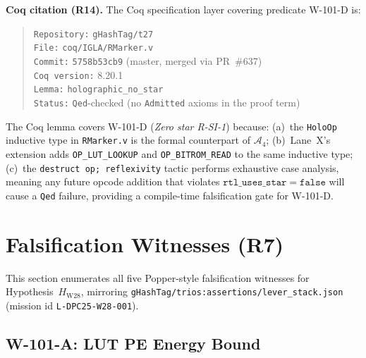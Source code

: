 \noindent
\textbf{Coq citation (R14).}
The Coq specification layer covering predicate W-101-D is:

\begin{quote}
\texttt{Repository:} \texttt{gHashTag/t27}\\
\texttt{File:} \texttt{coq/IGLA/RMarker.v}\\
\texttt{Commit:} \texttt{5758b53cb9} (master, merged via PR~\#637)\\
\texttt{Coq version:} 8.20.1\\
\texttt{Lemma:} \texttt{holographic\_no\_star}\\
\texttt{Status:} \texttt{Qed}-checked (no \texttt{Admitted} axioms in the proof term)
\end{quote}

The Coq lemma covers W-101-D (\emph{Zero star R-SI-1}) because:
(a)~the \texttt{HoloOp} inductive type in \texttt{RMarker.v} is the formal
counterpart of \(\mathcal{A}_{4}\); (b)~Lane~X's extension adds
\texttt{OP\_LUT\_LOOKUP} and \texttt{OP\_BITROM\_READ} to the same inductive
type; (c)~the \texttt{destruct op; reflexivity} tactic performs exhaustive
case analysis, meaning any future opcode addition that violates
\(\mathtt{rtl\_uses\_star} = \mathtt{false}\) will cause a \texttt{Qed}
failure, providing a compile-time falsification gate for W-101-D.

\section{Falsification Witnesses (R7)}
\label{sec:falsification_witnesses}

This section enumerates all five Popper-style falsification witnesses for
Hypothesis~\(H_{\mathrm{W28}}\), mirroring
\texttt{gHashTag/trios:assertions/lever\_stack.json}
(mission id \texttt{L-DPC25-W28-001}).

\subsection{W-101-A: LUT PE Energy Bound}
\label{sec:w101a}

